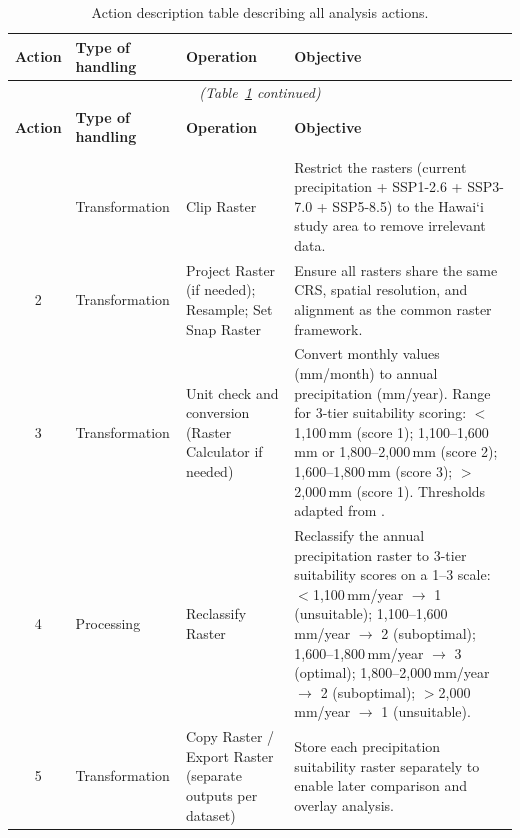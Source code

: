 \documentclass[12pt,a4paper]{article}
\newcommand{\okina}{\textquoteleft}
\begin{document}
\begin{landscape}
\begin{longtable}{@{}c >{\raggedright\arraybackslash}p{2.8cm} >{\raggedright\arraybackslash}p{6.5cm} >{\raggedright\arraybackslash}p{12.8cm}@{}}
  \caption{Action description table describing all analysis actions.}
  \label{tab:dam_actions}\\
  \toprule
  \textbf{Action} & \textbf{Type of handling} & \textbf{Operation} & \textbf{Objective} \\
  \midrule
  \endfirsthead
  \multicolumn{4}{c}{\itshape (Table~\ref{tab:dam_actions} continued)}\\
  \toprule
  \textbf{Action} & \textbf{Type of handling} & \textbf{Operation} & \textbf{Objective} \\
  \midrule
  \endhead
  \bottomrule
  \endfoot
  \multicolumn{4}{@{}l}{\textit{\textbf{Precipitation} (for all three projections)}} \\
  \addlinespace
  1 & Transformation & Clip Raster & Restrict the rasters (current precipitation + SSP1-2.6 + SSP3-7.0 + SSP5-8.5) to the Hawai\okina i study area to remove irrelevant data. \\
  2 & Transformation & Project Raster (if needed); Resample; Set Snap Raster & Ensure all rasters share the same CRS, spatial resolution, and alignment as the common raster framework. \\
  3 & Transformation & Unit check and conversion (Raster Calculator if needed) & Convert monthly values (mm/month) to annual precipitation (mm/year). Range for 3-tier suitability scoring: $<$1{,}100\,mm (score 1); 1{,}100--1{,}600\,mm or 1{,}800--2{,}000\,mm (score 2); 1{,}600--1{,}800\,mm (score 3); $>$2{,}000\,mm (score 1). Thresholds adapted from \citet{DaMatta2006}. \\
  4 & Processing & Reclassify Raster & Reclassify the annual precipitation raster to 3-tier suitability scores on a 1--3 scale: $<$1{,}100\,mm/year $\rightarrow$ 1 (unsuitable); 1{,}100--1{,}600\,mm/year $\rightarrow$ 2 (suboptimal); 1{,}600--1{,}800\,mm/year $\rightarrow$ 3 (optimal); 1{,}800--2{,}000\,mm/year $\rightarrow$ 2 (suboptimal); $>$2{,}000\,mm/year $\rightarrow$ 1 (unsuitable). \\
  5 & Transformation & Copy Raster / Export Raster (separate outputs per dataset) & Store each precipitation suitability raster separately to enable later comparison and overlay analysis. \\

\end{longtable}
\end{landscape}
\end{document}
